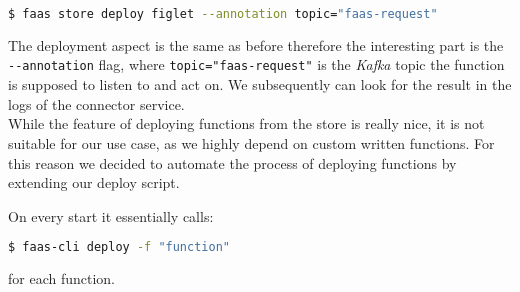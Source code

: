 \begin{lstlisting}[language=bash]
  $ faas store deploy figlet --annotation topic="faas-request"
\end{lstlisting}

The deployment aspect is the same as before therefore the interesting part is the
\texttt{-{}-annotation} flag, where \texttt{topic="faas-request"} is the \textit{Kafka} topic the
function is supposed to listen to and act on. We subsequently can look for the result in the logs of
the connector service. \\
While the feature of deploying functions from the store is really nice, it is not suitable for our
use case, as we highly depend on custom written functions. For this reason we decided to automate
the process of deploying functions by extending our deploy script.

On every start it essentially calls:

\begin{lstlisting}[language=bash]
  $ faas-cli deploy -f "function"
\end{lstlisting}

for each function.
